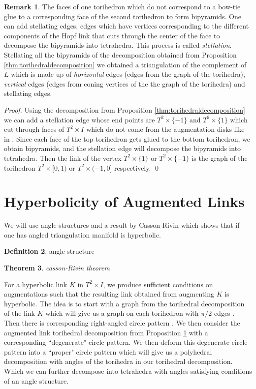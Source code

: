 \documentclass[11pt]{amsart}
\theoremstyle{plain}
\newtheorem{theorem}{Theorem}[section]
\theoremstyle{definition}
\newtheorem{define}[theorem]{Definition}
\newtheorem{remark}[theorem]{Remark}
\begin{document}
\begin{remark}\label{cor:triangulation}
The faces of one torihedron which do not correspond to a bow-tie glue to a corresponding face of the second torihedron to form bipyramids. One can add stellating edges, edges which have vertices corresponding to the different components of the Hopf link that cuts through the center of the face to decompose the bipyramids into tetrahedra. This process is called {\it stellation}. Stellating all the bipyramids of the decomposition obtained from Proposition \ref{thm:torihedraldecomposition} we obtained a triangulation of the complement of $L$ which is made up of {\it horizontal} edges (edges from the graph of the torihedra), {\it vertical} edges (edges from coning vertices of the the graph of the torihedra) and stellating edges. 
\end{remark}

{\it Proof.}  Using the decomposition from Proposition \ref{thm:torihedraldecomposition} we can add a stellation edge whose end points are $T^2 \times \{-1\}$ and $T^2 \times \{1\}$ which cut through faces of $T^2 \times I$ which do not come from the augmentation disks like in \cite{CKP2}. Since each face of the top torihedron gets glued to the bottom torihedron, we obtain bipyramids, and the stellation edge will decompose the bipyramids into tetrahedra. Then the link of the vertex  $T^2 \times \{1\}$ or $T^2 \times \{-1\}$ is the graph of the torihedron $T^2 \times [0,1)$ or $T^2 \times (-1,0]$ respectively. \qed

\section{Hyperbolicity of Augmented Links}

We will use angle structures and a result by Casson-Rivin which shows that if one has angled triangulation manifold is hyperbolic. 

\begin{define}
angle structure
\end{define}

\begin{theorem}\cite{ANGLE STRUCTURE PAPER}
casson-Rivin theorem
\end{theorem}

For a hyperbolic link $K$ in $T^2 \times I$, we produce sufficient conditions on augmentations such that the resulting link obtained from augmenting $K$ is hyperbolic. The idea is to start with a graph from the torihedral decomposition of the link $K$ which will give us a graph on each torihedron with $\pi/2$ edges \cite{CKP}. Then there is corresponding right-angled circle pattern \cite{B-S}. We then consider the augmented link torihedral decomposition from Proposition \ref{} with a corresponding ``degenerate" circle pattern. We then deform this degenerate circle pattern into a ``proper" circle pattern which will give us a polyhedral decomposition with angles of the torihedra in our torihedral decomposition. Which we can further decompose into tetrahedra with angles satisfying conditions of an angle structure. 
\end{document}
